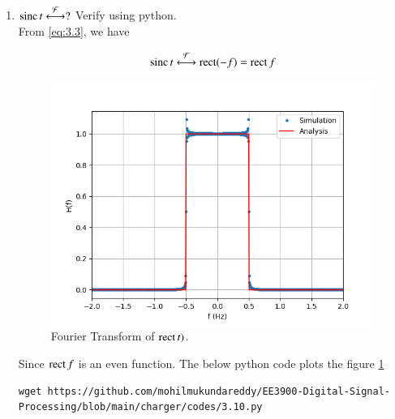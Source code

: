 \documentclass[journal,12pt,twocolumn]{IEEEtran}
\renewcommand\thesection{\arabic{section}}
\begin{document}
\begin{enumerate}[label=\thesection.\arabic*
	,ref=\thesection.\theenumi]
	\item $\mathop{\mathrm{sinc}}{t}\overset{\mathcal{F}}{ \longleftrightarrow} ?$  Verify using python.\\
	\solution From \eqref{eq:3.3}, we have 
	
	\begin{align}
		\mathop{\mathrm{sinc}}{t}\overset{\mathcal{F}}{ \longleftrightarrow}\mathop{\mathrm{rect}}(-f)=\mathop{\mathrm{rect}}{f}
		\label{eq:fourier-sinc}
	\end{align}
\begin{figure}[!ht]
	\includegraphics[width=\columnwidth]{figs/3.10.png}
	\caption{Fourier Transform of $\mathop{\mathrm{rect}}{t})$.}
	\label{fig:3.10}
\end{figure}
	Since $\mathop{\mathrm{rect}}{f}$ is an even function.
	The below python code plots the figure \ref{fig:3.10}
	\begin{lstlisting}
wget https://github.com/mohilmukundareddy/EE3900-Digital-Signal-Processing/blob/main/charger/codes/3.10.py
	\end{lstlisting} 

\end{enumerate}
\end{document}
